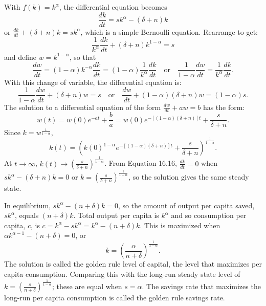 \begin{original}
With $f(k) = k^{\alpha}$, the differential equation becomes
\[
\frac{dk}{dt} = sk^{\alpha} - (\delta + n)k
\]
or $\frac{dk}{dt} + (\delta + n)k = sk^{\alpha}$, which is a simple Bernoulli equation. Rearrange to get:
\[
\frac{1}{k^{\alpha}}\frac{dk}{dt} + (\delta + n)k^{1-\alpha} = s
\]
and define $w = k^{1-\alpha}$, so that
\[
\frac{dw}{dt} = (1 - \alpha)k^{-\alpha}\frac{dk}{dt} = (1 - \alpha)\frac{1}{k^{\alpha}}\frac{dk}{dt}\quad \text{or}\quad \frac{1}{1 - \alpha}\frac{dw}{dt} = \frac{1}{k^{\alpha}}\frac{dk}{dt}.
\]
With this change of variable, the differential equation is:
\[
\frac{1}{1 - \alpha}\frac{dw}{dt} + (\delta + n)w = s \quad\text{or}\quad \frac{dw}{dt} + (1 - \alpha)(\delta + n)w = (1 - \alpha)s.
\]
The solution to a differential equation of the form $\frac{dw}{dt} + aw = b$ has the form:
\[
w(t) = w(0)e^{-at} + \frac{b}{a} = w(0)e^{-[(1-\alpha)(\delta+n)]t} + \frac{s}{\delta + n}.
\]
Since $k = w^{\frac{1}{1-\alpha}}$,
\[
k(t) = \left(k(0)^{1-\alpha} e^{-[(1-\alpha)(\delta+n)]t} + \frac{s}{\delta + n}\right)^{\frac{1}{1-\alpha}}.
\]
At $t \to \infty$, $k(t) \to \left(\frac{s}{\delta + n}\right)^{\frac{1}{1-\alpha}}$. From Equation 16.16, $\frac{dk}{dt} = 0$ when $sk^{\alpha} - (\delta + n)k = 0$ or $k = \left(\frac{s}{\delta + n}\right)^{\frac{1}{1-\alpha}}$, so the solution gives the same steady state.

In equilibrium, $sk^{\alpha} - (n + \delta)k = 0$, so the amount of output per capita saved, $sk^{\alpha}$, equals $(n+\delta)k$. Total output per capita is $k^{\alpha}$ and so consumption per capita, $c$, is $c = k^{\alpha} - sk^{\alpha} = k^{\alpha} - (n + \delta)k$. This is maximized when $\alpha k^{\alpha-1} - (n + \delta) = 0$, or
\[
k = \left(\frac{\alpha}{n + \delta}\right)^{\frac{1}{1-\alpha}}.
\]
The solution is called the golden rule level of capital, the level that maximizes per capita consumption. Comparing this with the long-run steady state level of $k = (\frac{s}{n+\delta})^{\frac{1}{1-\alpha}}$; these are equal when $s = \alpha$. The savings rate that maximizes the long-run per capita consumption is called the golden rule savings rate.
\end{original}
